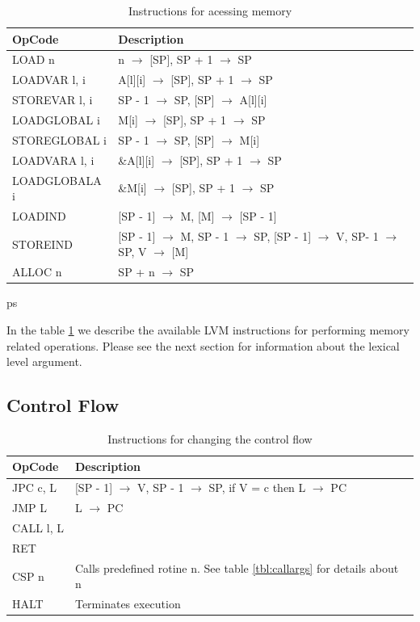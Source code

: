 \documentclass[a4paper, 11pt]{report}
\newcommand{\arrow}{\ensuremath{\rightarrow}}
\begin{document}
\begin{table}[htb]
 \begin{tabular}{|l|l|}
  \hline
  OpCode & Description\\
  \hline\hline
  LOAD n & n \arrow{} [SP], SP + 1 \arrow{} SP\\ 
  LOADVAR l, i & A[l][i] \arrow{} [SP], SP + 1 \arrow{} SP\\
  STOREVAR l, i & SP - 1 \arrow{} SP, [SP] \arrow{} A[l][i]\\
  LOADGLOBAL i & M[i] \arrow{} [SP], SP + 1 \arrow{} SP\\
  STOREGLOBAL i &  SP - 1 \arrow{} SP, [SP] \arrow{} M[i]\\
  LOADVARA l, i & \&A[l][i] \arrow{} [SP], SP + 1 \arrow{} SP\\
  LOADGLOBALA i & \&M[i] \arrow{} [SP], SP + 1 \arrow{} SP\\
  LOADIND & [SP - 1] \arrow{} M, [M] \arrow{} [SP - 1]\\
  STOREIND & [SP - 1] \arrow{} M, SP - 1 \arrow{} SP, [SP - 1] \arrow{} V, SP- 1 \arrow{} SP, V \arrow{} [M]\\
  ALLOC n & SP + n \arrow{} SP\\
   \hline
 \end{tabular}
 \caption{Instructions for acessing memory}
ps \label{tbl:meminst}
\end{table}

In the table \ref{tbl:meminst} we describe the available LVM instructions for performing memory
related operations. Please see the next section for information about the lexical level argument.


\subsection{Control Flow}

\begin{table}[htb]
 \begin{tabular}{|l|l|}
  \hline
  OpCode & Description\\
  \hline\hline
  JPC c, L & [SP - 1] \arrow{} V, SP - 1 \arrow{} SP, if V = c then L \arrow{} PC\\
  JMP L & L \arrow{} PC\\
  CALL l, L & \\
  RET &\\ 
  CSP n & Calls predefined rotine n. See table \ref{tbl:callargs} for details about n\\
  HALT & Terminates execution\\
  \hline
 \end{tabular}
 \caption{Instructions for changing the control flow}
 \label{tbl:ctrlflow}
\end{table}
\end{document}
